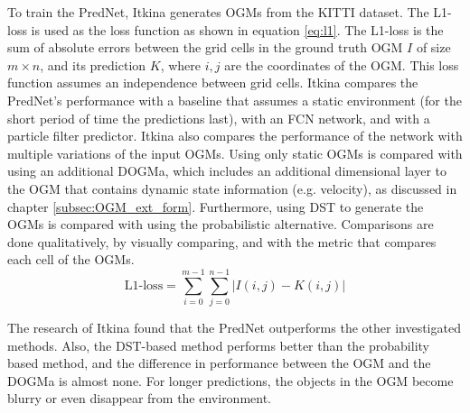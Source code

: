 To train the PredNet, Itkina \cite{itkina2019dynamic} generates \glspl{OGM} from the \gls{KITTI} \cite{geiger2013vision} dataset. The L1-loss is used as the loss function as shown in equation \ref{eq:l1}. The L1-loss is the sum of absolute errors between the grid cells in the ground truth \gls{OGM} $I$ of size $m \times n$, and its prediction $K$, where $i, j$ are the coordinates of the \gls{OGM}. This loss function assumes an independence between grid cells. Itkina \cite{itkina2019dynamic} compares the PredNet's performance with a baseline that assumes a static environment (for the short period of time the predictions last), with an FCN network, and with a particle filter predictor. Itkina \cite{itkina2019dynamic} also compares the performance of the network with multiple variations of the input \glspl{OGM}. Using only static \glspl{OGM} is compared with using an additional \gls{DOGMa}, which includes an additional dimensional layer to the \gls{OGM} that contains dynamic state information (e.g. velocity), as discussed in chapter \ref{subsec:OGM_ext_form}. Furthermore, using \gls{DST} to generate the \glspl{OGM} is compared with using the probabilistic alternative. Comparisons are done qualitatively, by visually comparing, and with the  metric that compares each cell of the \glspl{OGM}.  \\

\begin{equation} \label{eq:l1}
	\text{L1-loss} = \sum_{i=0}^{m-1}\sum_{j=0}^{n-1}|I(i,j)-K(i,j)|
\end{equation}

The research of Itkina \cite{itkina2019dynamic} found that the PredNet outperforms the other investigated methods. Also, the \gls{DST}-based method performs better than the probability based method, and the difference in performance between the \gls{OGM} and the \gls{DOGMa} is almost none. For longer predictions, the objects in the \gls{OGM} become blurry or even disappear from the environment. \\

